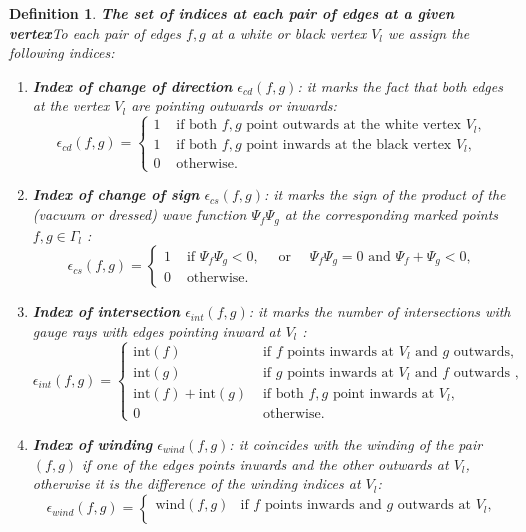 \documentclass[11pt]{amsart}
\theoremstyle{plain}
\numberwithin{equation}{section}
\newtheorem{definition}{Definition}[subsection]
\begin{document}
\begin{definition}\textbf{The set of indices at each pair of edges at a given vertex}\label{def:index_pair}
To each pair of edges $f,g$ at a white or black vertex $V_l$ we assign the following indices: 
\begin{enumerate}
\item \textbf{Index of change of direction} $\epsilon_{cd}(f,g)$: it marks the fact that both edges at the vertex $V_l$ are pointing outwards or inwards: 
\[
\epsilon_{cd}(f,g) = \left\{ \begin{array}{ll}  1 & \mbox{ if both } f, g \mbox{ point outwards at the white vertex } V_l,\\
1 & \mbox{ if both } f, g \mbox{ point inwards at the black vertex } V_l,\\
0 & \mbox{ otherwise}.
\end{array}\right.
\]
\item  \textbf{Index of change of sign} $\epsilon_{cs}(f,g)$: it marks the sign of the product of the (vacuum or dressed) wave function $\Psi_f\Psi_g$ at the corresponding marked points $f,g\in\Gamma_l$ : 
\[
\epsilon_{cs}(f,g) = \left\{\begin{array}{ll}  1 & \mbox{ if  } \Psi_f\Psi_g<0, \quad \mbox{ or } \quad \Psi_f\Psi_g=0  \mbox{ and } \Psi_f+ \Psi_g<0,\\
0 & \mbox{ otherwise}.
\end{array}\right.
\]
\item \textbf{Index of intersection} $\epsilon_{int}(f,g)$: it marks the number of intersections with gauge rays with edges pointing inward at $V_l$ : 
\[
\epsilon_{int}(f,g) = \left\{\begin{array}{ll}  \mbox{int} (f) & \mbox{ if  } f \mbox{ points inwards at }  V_l \mbox{ and } g \mbox{ outwards},\\
\mbox{int} (g) & \mbox{ if  } g \mbox{ points inwards at } V_l \mbox{ and } f \mbox{ outwards },\\
\mbox{int} (f)+\mbox{int} (g)  & \mbox{ if  both } f, g \mbox{ point inwards at } V_l,\\
0 & \mbox{ otherwise}.
\end{array}\right.
\]
\item \textbf{Index of winding} $\epsilon_{wind}(f,g)$: it coincides with the winding of the pair $(f,g)$ if one of the edges points inwards and the other outwards at $V_l$, 
otherwise it is the difference of the winding indices at $V_l$: 
\[
\epsilon_{wind}(f,g) = \left\{\begin{array}{ll}  \mbox{wind} (f,g) & \mbox{if $f$ points inwards and $g$ outwards at } V_l,\\

\end{array}\]
\end{enumerate}
\end{definition}
\end{document}
